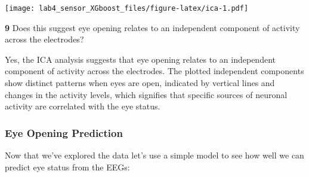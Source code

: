 \documentclass[
]{article}
\newenvironment{Shaded}{\begin{snugshade}}{\end{snugshade}}
\newcommand{\AttributeTok}[1]{\textcolor[rgb]{0.13,0.29,0.53}{#1}}
\newcommand{\CommentTok}[1]{\textcolor[rgb]{0.56,0.35,0.01}{\textit{#1}}}
\newcommand{\DecValTok}[1]{\textcolor[rgb]{0.00,0.00,0.81}{#1}}
\newcommand{\FloatTok}[1]{\textcolor[rgb]{0.00,0.00,0.81}{#1}}
\newcommand{\FunctionTok}[1]{\textcolor[rgb]{0.13,0.29,0.53}{\textbf{#1}}}
\newcommand{\NormalTok}[1]{#1}
\newcommand{\OtherTok}[1]{\textcolor[rgb]{0.56,0.35,0.01}{#1}}
\newcommand{\SpecialCharTok}[1]{\textcolor[rgb]{0.81,0.36,0.00}{\textbf{#1}}}
\newcommand{\StringTok}[1]{\textcolor[rgb]{0.31,0.60,0.02}{#1}}
\begin{document}
\texttt{[image: lab4\_sensor\_XGboost\_files/figure-latex/ica-1.pdf]}

\textbf{9} Does this suggest eye opening relates to an independent
component of activity across the electrodes?

Yes, the ICA analysis suggests that eye opening relates to an
independent component of activity across the electrodes. The plotted
independent components show distinct patterns when eyes are open,
indicated by vertical lines and changes in the activity levels, which
signifies that specific sources of neuronal activity are correlated with
the eye status.

\subsubsection{Eye Opening Prediction}\label{eye-opening-prediction}

Now that we've explored the data let's use a simple model to see how
well we can predict eye status from the EEGs:

\begin{Shaded}
\end{Shaded}
\end{document}
